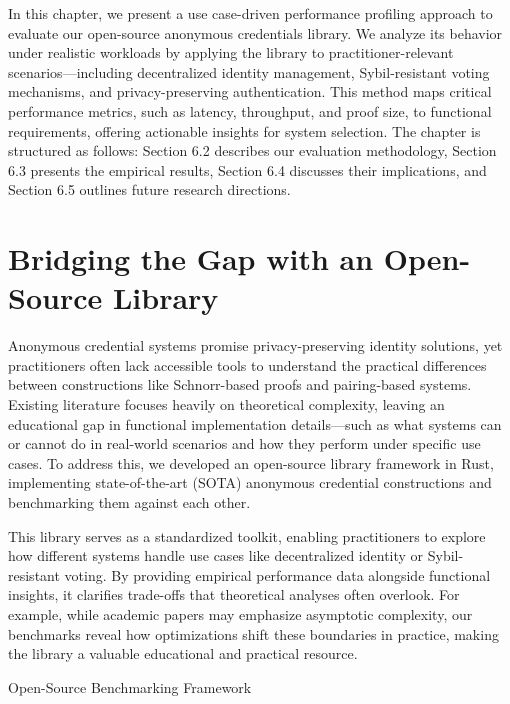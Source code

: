 In this chapter, we present a use case-driven performance profiling approach to evaluate our open-source anonymous credentials library. We analyze its behavior under realistic workloads by applying the library to practitioner-relevant scenarios—including decentralized identity management, Sybil-resistant voting mechanisms, and privacy-preserving authentication. This method maps critical performance metrics, such as latency, throughput, and proof size, to functional requirements, offering actionable insights for system selection. The chapter is structured as follows: Section 6.2 describes our evaluation methodology, Section 6.3 presents the empirical results, Section 6.4 discusses their implications, and Section 6.5 outlines future research directions.




\section{Bridging the Gap with an Open-Source Library}

Anonymous credential systems promise privacy-preserving identity solutions, yet practitioners often lack accessible tools to understand the practical differences between constructions like Schnorr-based proofs and pairing-based systems. Existing literature focuses heavily on theoretical complexity, leaving an educational gap in functional implementation details—such as what systems can or cannot do in real-world scenarios and how they perform under specific use cases. To address this, we developed an open-source library framework in Rust, implementing state-of-the-art (SOTA) anonymous credential constructions and benchmarking them against each other.

This library serves as a standardized toolkit, enabling practitioners to explore how different systems handle use cases like decentralized identity or Sybil-resistant voting. By providing empirical performance data alongside functional insights, it clarifies trade-offs that theoretical analyses often overlook. For example, while academic papers may emphasize asymptotic complexity, our benchmarks reveal how optimizations shift these boundaries in practice, making the library a valuable educational and practical resource.

Open-Source Benchmarking Framework

